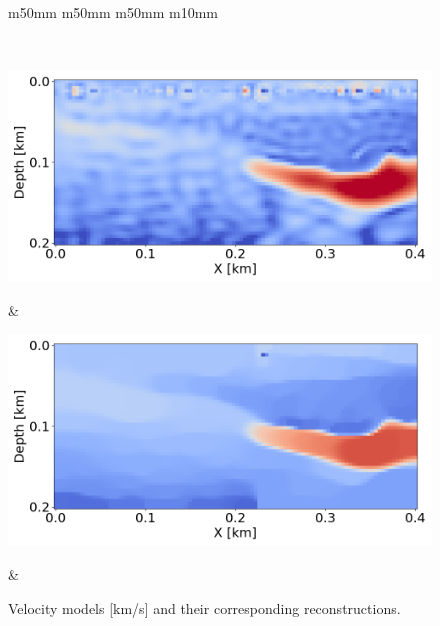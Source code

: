 \begin{figure}[htbp]
\begin{tabular}{m{50mm} m{50mm} m{50mm} m{10mm}}
\begin{minipage}[b]{\linewidth}
            \vspace{-7mm}
            \caption*{\footnotesize Proposed Method, $\alpha = 550$}
            \vspace{1mm}
        \end{minipage} \\

        \begin{minipage}[b]{\linewidth}
            \centering
            \includegraphics[width=\linewidth]{public/gradient_noisy}
            \vspace{-7mm}
            \caption*{\footnotesize The Standard FWI Method \\ (with the noisy observed seismic data)}
            \vspace{1mm}
        \end{minipage} &
        \begin{minipage}[b]{\linewidth}
            \centering
            \includegraphics[width=\linewidth]{public/alpha_300_noisy}
            \vspace{-7mm}
            \caption*{\footnotesize Proposed Method, $\alpha = 300$ \\ (with the noisy observed seismic data)}
            \vspace{1mm}
        \end{minipage} &
    \end{tabular}
    \vspace{-3mm}
    \caption{Velocity models [km/s] and their corresponding reconstructions.}
    \label{fig:velocity-models}
\end{figure}
